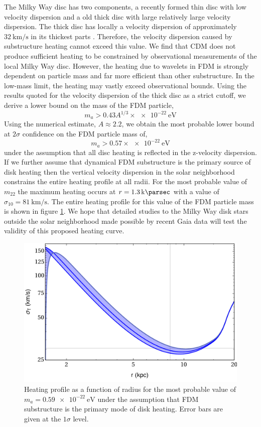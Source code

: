 \documentclass[usenatbib]{mnras}
\begin{document}
The Milky Way disc has two components, a recently formed thin disc with low velocity dispersion and a old thick disc with large relatively large velocity dispersion. The thick disc has locally a velocity dispersion of approximately $\SI{32}{\kilo\meter\per\second}$ in its thickest parts \citep{milky_way}. Therefore, the velocity dispersion caused by substructure heating cannot exceed this value. We find that CDM does not produce sufficient heating to be constrained by observational measurements of the local  Milky Way disc. However, the heating due to wavelets in FDM is strongly dependent on particle mass and far more efficient than other substructure. In the low-mass limit, the heating may vastly exceed observational bounds. Using the results quoted for the velocity dispersion of the thick disc as a strict cutoff, we derive a lower bound on the mass of the FDM particle,
\begin{equation}
m_a > 0.43 A^{1/3} \times \SI{e-22}{\electronvolt}
\end{equation}
Using the numerical estimate, $A \approx 2.2$, we obtain the most probable lower bound at $2 \sigma$ confidence on the FDM particle mass of,
\[ m_a > 0.57 \times \SI{e-22}{\electronvolt} \]
under the assumption that all disc heating is reflected in the z-velocity dispersion. If we further assume that dynamical FDM substructure is the primary source of disk heating then the vertical velocity dispersion in the solar neighborhood constrains the entire heating profile at all radii. For the most probable value of $m_{22}$ the maximum heating occurs at $r = \SI{1.3}{\kilo \parsec}$ with a value of $\sigma_{10} = \SI{81}{\kilo\meter\per\second}$. The entire heating profile for this value of the FDM particle mass is shown in figure \ref{fig:heating_shape}. We hope that detailed studies to the Milky Way disk stars outside the solar neighborhood made possible by recent Gaia data will test the validity of this proposed heating curve.   

\begin{figure}
\includegraphics[width=\columnwidth]{heating_shape}
\vspace*{-5mm}
\caption{Heating profile as a function of radius for the most probable value of $m_{a} = \SI{0.59 e-22}{\electronvolt}$ under the assumption that FDM substructure is the primary mode of disk heating. Error bars are given at the $1 \sigma$ level. }
\label{fig:heating_shape}
\end{figure}
\end{document}

